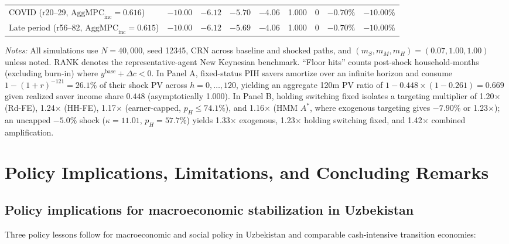 \documentclass[11pt]{article}
\begin{document}
\begin{table}[tbp]
{\begin{tabular}{lcccccccc}
COVID (r20--29, $\text{AggMPC}_{\text{inc}} = 0.616$) & $-10.00$ & $-6.12$ & $-5.70$ & $-4.06$ & 1.000 & 0 & $-0.70\%$ & $-10.00\%$ \\
Late period (r56--82, $\text{AggMPC}_{\text{inc}} = 0.615$) & $-10.00$ & $-6.12$ & $-5.69$ & $-4.06$ & 1.000 & 0 & $-0.70\%$ & $-10.00\%$ \\
\bottomrule
\end{tabular}%
}
\begin{flushleft}
\footnotesize\textit{Notes:} All simulations use $N = 40{,}000$, seed 12345, CRN across baseline and shocked paths, and $(m_S, m_M, m_H) = (0.07, 1.00, 1.00)$ unless noted. RANK denotes the representative-agent New Keynesian benchmark. ``Floor hits'' counts post-shock household-months (excluding burn-in) where $y^{\text{base}} + \Delta c < 0$. In Panel A, fixed-status PIH savers amortize over an infinite horizon and consume $1 - (1+r)^{-121} = 26.1\%$ of their shock PV across $h = 0, \dots, 120$, yielding an aggregate 120m PV ratio of $1 - 0.448 \times (1 - 0.261) = 0.669$ given realized saver income share $0.448$ (asymptotically 1.000). In Panel B, holding switching fixed isolates a targeting multiplier of 1.20$\times$ (Rd-FE), 1.24$\times$ (HH-FE), 1.17$\times$ (earner-capped, $p_H \le 74.1\%$), and 1.16$\times$ (HMM $A^*$, where exogenous targeting gives $-7.90\%$ or 1.23$\times$); an uncapped $-5.0\%$ shock ($\kappa = 11.01$, $p_H = 57.7\%$) yields 1.33$\times$ exogenous, 1.23$\times$ holding switching fixed, and 1.42$\times$ combined amplification.
\end{flushleft}
\end{table}

\FloatBarrier
\section{Policy Implications, Limitations, and Concluding Remarks}\label{sec:limits}

\subsection{Policy implications for macroeconomic stabilization in Uzbekistan}\label{sec:policy}

Three policy lessons follow for macroeconomic and social policy in Uzbekistan and comparable cash-intensive transition economies:
\end{document}
